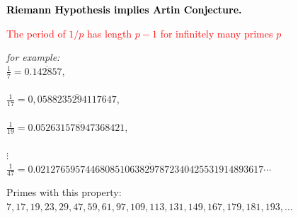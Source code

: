 \documentclass[landscape,display]{powersem} %
\newcommand{\heading}[1]{%
 \begin{center}
  \large\bf
  \shadowbox{{\textcolor{conceptcolor}{#1}}}%
 \end{center}
 \vspace{1ex minus 1ex}}
\begin{document}
\begin{slide}
 \heading{Hooley's Contribution}

\textcolor{black}{\textbf{Riemann Hypothesis implies Artin Conjecture.}} \pause

\textcolor{red}{ The period of $1/p$ has length $p-1$ for infinitely many primes $p$}\pause

\begin{minipage}{8cm}
\textit{for example:} \\
$\frac17=0.\overline{142857}$,\\
\\
$\frac1{17}=0,\overline{0588235294117647}$,\\
\\
$\frac1{19}=0.\overline{052631578947368421},$\\
\\
$\vdots $\\
$\frac1{47}=$\scriptsize{$0.\overline{0212765957446808510638297872340425531914893617} \cdots$}\end{minipage}\medskip\pause

\begin{scriptsize}
Primes with this property: $7, 17, 19, 23, 29, 47, 59, 61, 97, 109, 113, 131, 149, 167, 179, 181, 193,\ldots$
\end{scriptsize}
\end{slide}
\end{document}
